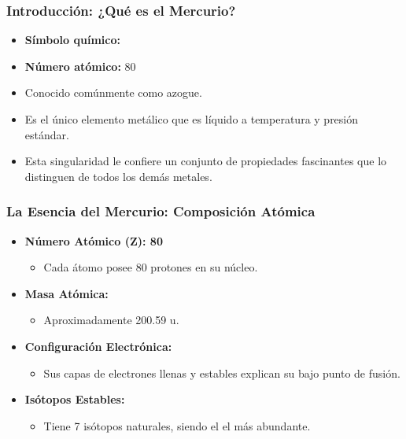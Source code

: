 \begin{frame}
    \frametitle{Introducción: ¿Qué es el Mercurio?}
    \begin{itemize}
        \item \textbf{Símbolo químico:} 
        \item \textbf{Número atómico:} 80
        \item Conocido comúnmente como azogue.
        \item Es el único elemento metálico que es líquido a temperatura y 
					presión estándar.
        \item Esta singularidad le confiere un conjunto de propiedades 
					fascinantes que lo distinguen de todos los demás metales.
    \end{itemize}
\end{frame}


\begin{frame}
    \frametitle{La Esencia del Mercurio: Composición Atómica}
    \begin{itemize}
        \item \textbf{Número Atómico (Z): 80}
            \begin{itemize}
                \item Cada átomo posee 80 protones en su núcleo.
            \end{itemize}
        \medskip
        \item \textbf{Masa Atómica:}
            \begin{itemize}
                \item Aproximadamente 200.59 u.
            \end{itemize}
        \medskip
        \item \textbf{Configuración Electrónica: }
            \begin{itemize}
                \item Sus capas de electrones llenas y estables explican su 
									bajo punto de fusión.
            \end{itemize}
        \medskip
        \item \textbf{Isótopos Estables:}
            \begin{itemize}
                \item Tiene 7 isótopos naturales, siendo el  el 
									más abundante.
            \end{itemize}
    \end{itemize}
\end{frame}


